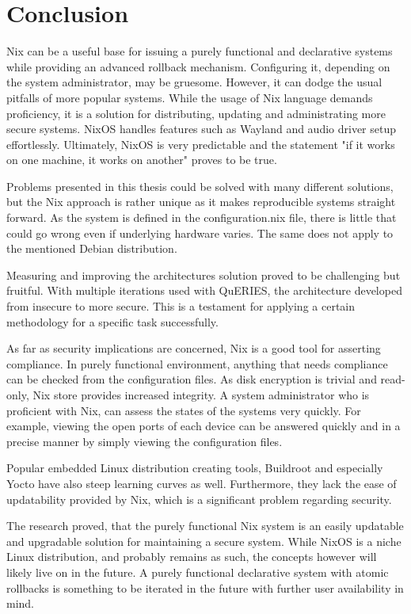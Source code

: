 \chapter{Conclusion} \label{conclusion}

Nix can be a useful base for issuing a purely functional and
declarative systems while providing an advanced rollback
mechanism. Configuring it, depending on the system administrator, may
be gruesome. However, it can dodge the usual pitfalls of more popular
systems. While the usage of Nix language demands proficiency, it is a
solution for distributing, updating and administrating more secure
systems. NixOS handles features such as Wayland and audio driver setup
effortlessly. Ultimately, NixOS is very predictable and the statement
"if it works on one machine, it works on another" proves to be true.

Problems presented in this thesis could be solved with many different solutions,
but the Nix approach is rather unique as it makes reproducible systems straight forward. As the system is defined in the
configuration.nix file, there is little that could go wrong even if 
underlying hardware varies. The same does not apply to the mentioned
Debian distribution.

Measuring and improving the architectures solution proved to be
challenging but fruitful. With multiple iterations used with QuERIES,
the architecture developed from insecure to more secure. This is a
testament for applying a certain methodology for a
specific task successfully.

As far as security implications are concerned, Nix is a good tool for
asserting compliance. In purely functional environment, anything that
needs compliance can be checked from the configuration files. As disk
encryption is trivial and read-only, Nix store provides increased
integrity. A system administrator who is proficient with Nix, can
assess the states of the systems very quickly. For example, viewing
the open ports of each device can be answered quickly and in a precise
manner by simply viewing the configuration files.

Popular embedded Linux distribution creating tools,
Buildroot and especially Yocto have also steep learning curves as well. Furthermore, they
lack the ease of updatability provided by Nix, which is a
significant problem regarding security.

The research proved, that the purely functional Nix system is an
easily updatable and upgradable solution for maintaining a secure
system.  While NixOS is a niche Linux distribution, and probably
remains as such, the concepts however will likely live on in the
future. A purely functional declarative system with atomic rollbacks
is something to be iterated in the future with further user
availability in mind.
